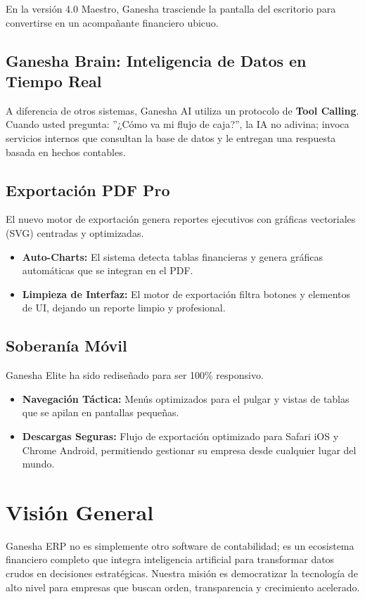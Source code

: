 \documentclass[12pt, a4paper, oneside]{book}
\begin{document}
En la versión 4.0 Maestro, Ganesha trasciende la pantalla del escritorio para convertirse en un acompañante financiero ubicuo.

\section{Ganesha Brain: Inteligencia de Datos en Tiempo Real}
A diferencia de otros sistemas, Ganesha AI utiliza un protocolo de \textbf{Tool Calling}. Cuando usted pregunta: ''¿Cómo va mi flujo de caja?'', la IA no adivina; invoca servicios internos que consultan la base de datos y le entregan una respuesta basada en hechos contables.

\section{Exportación PDF Pro}
El nuevo motor de exportación genera reportes ejecutivos con gráficas vectoriales (SVG) centradas y optimizadas.
\begin{itemize}
    \item \textbf{Auto-Charts:} El sistema detecta tablas financieras y genera gráficas automáticas que se integran en el PDF.
    \item \textbf{Limpieza de Interfaz:} El motor de exportación filtra botones y elementos de UI, dejando un reporte limpio y profesional.
\end{itemize}

\section{Soberanía Móvil}
Ganesha Elite ha sido rediseñado para ser 100\% responsivo. 
\begin{itemize}
    \item \textbf{Navegación Táctica:} Menús optimizados para el pulgar y vistas de tablas que se apilan en pantallas pequeñas.
    \item \textbf{Descargas Seguras:} Flujo de exportación optimizado para Safari iOS y Chrome Android, permitiendo gestionar su empresa desde cualquier lugar del mundo.
\end{itemize}



\chapter{Visión General}
Ganesha ERP no es simplemente otro software de contabilidad; es un ecosistema financiero completo que integra inteligencia artificial para transformar datos crudos en decisiones estratégicas. Nuestra misión es democratizar la tecnología de alto nivel para empresas que buscan orden, transparencia y crecimiento acelerado.
\end{document}
